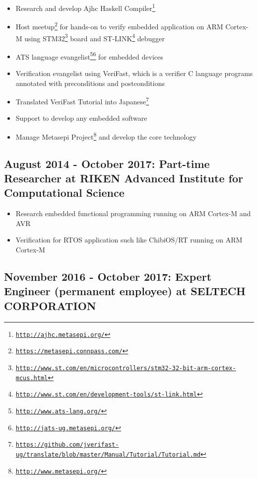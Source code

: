 \documentclass[letterpaper]{article}
\begin{document}
\begin{itemize}
  \item Research and develop Ajhc Haskell Compiler\footnote{\href{http://ajhc.metasepi.org/}{\tt http://ajhc.metasepi.org/}}
  \item Host meetup\footnote{\href{https://metasepi.connpass.com/}{\tt https://metasepi.connpass.com/}} for hands-on to verify embedded application on ARM Cortex-M using STM32\footnote{\href{http://www.st.com/en/microcontrollers/stm32-32-bit-arm-cortex-mcus.html}{\tt http://www.st.com/en/microcontrollers/stm32-32-bit-arm-cortex-mcus.html}} board and ST-LINK\footnote{\href{http://www.st.com/en/development-tools/st-link.html}{\tt http://www.st.com/en/development-tools/st-link.html}} debugger
  \item ATS language evangelist\footnote{\href{http://www.ats-lang.org/}{\tt http://www.ats-lang.org/}}\footnote{\href{http://jats-ug.metasepi.org/}{\tt http://jats-ug.metasepi.org/}} for embedded devices
  \item Verification evangelist using VeriFast, which is a verifier C language programs annotated with preconditions and postconditions
  \item Translated VeriFast Tutorial into Japanese\footnote{\href{https://github.com/jverifast-ug/translate/blob/master/Manual/Tutorial/Tutorial.md}{\tt https://github.com/jverifast-ug/translate/blob/master/Manual/Tutorial/Tutorial.md}}
  \item Support to develop any embedded software
  \item Manage Metasepi Project\footnote{\href{http://www.metasepi.org/}{\tt http://www.metasepi.org/}} and develop the core technology
\end{itemize}

\subsection*{August 2014 - October 2017: Part-time Researcher at RIKEN Advanced Institute for Computational Science}

\begin{itemize}
  \item Research embedded functional programming running on ARM Cortex-M and AVR
  \item Verification for RTOS application such like ChibiOS/RT running on ARM Cortex-M
\end{itemize}

\subsection*{November 2016 - October 2017: Expert Engineer (permanent employee) at SELTECH CORPORATION}
\end{document}
